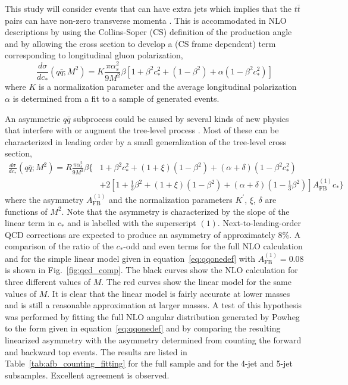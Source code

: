\documentclass{cmspaperpdf}
\begin{document}
This study will consider events that can have extra jets which implies that the $t\bar t$ pairs can have non-zero transverse momenta .  This is accommodated in NLO descriptions by using the Collins-Soper (CS) definition \cite{Collins:1977iv} of the production angle and by allowing the cross section to develop a (CS frame dependent) term corresponding to longitudinal gluon polarization,
\begin{equation}
\frac{d\sigma}{dc_*}(q\bar q;M^2) = K\frac{\pi\alpha_s^2}{9M^2}\beta\left[1+\beta^2c_*^2+\left(1-\beta^2\right)+\alpha\left(1-\beta^2c_*^2\right)\right]
\label{eq:qqnlodef}
\end{equation}
where $K$ is a normalization parameter and the average longitudinal polarization $\alpha$ is determined from a fit to a sample of generated events.

An asymmetric $q\bar q$ subprocess could be caused by several kinds of new physics that interfere with or augment the tree-level process   \cite{Cao:2010zb, Gresham:2011pa}.  Most of these can be characterized in leading order by a small generalization of the tree-level cross section,
\begin{align}
\frac{d\sigma}{dc_*}(q\bar q;M^2) = R\frac{\pi\alpha_s^2}{9M^2}\beta\biggl\lbrace&1+\beta^2c_*^2+\left(1+\xi\right)\left(1-\beta^2\right)+\left(\alpha+\delta\right)\left(1-\beta^2c_*^2\right) \nonumber \\
&+2\left[1+\frac{1}{3}\beta^2+(1+\xi)(1-\beta^2)+\left(\alpha+\delta\right)\left(1-\frac{1}{3}\beta^2\right)\right]A_\mathrm{FB}^{(1)}c_*\biggr\rbrace
\label{eq:qqonedef}
\end{align}
where the asymmetry $A_\mathrm{FB}^{(1)}$ and the normalization parameters $K^\prime$, $\xi$, $\delta$ are functions of $M^2$.  Note that the asymmetry is characterized by the slope of the linear term in $c_*$ and is labelled with the superscript $(1)$.  Next-to-leading-order QCD corrections are expected  \cite{Kuhn:1998kw} to produce an asymmetry of approximately 8\%.  A comparison of the ratio of the $c_*$-odd and even terms for the full NLO calculation and for the simple linear model given in equation~\ref{eq:qqonedef} with $A_\mathrm{FB}^{(1)} = 0.08$ is shown in Fig.~\ref{fig:qcd_comp}.  The black curves show the NLO calculation for three different values of $M$.  The red curves show the linear model for the same values of $M$.  It is clear that the linear model is fairly accurate at lower masses and is still a reasonable approximation at larger masses.  A test of this hypothesis was performed by fitting the full NLO angular distribution generated by Powheg to the form given in equation~\ref{eq:qqonedef} and by comparing the resulting linearized asymmetry with the asymmetry determined from counting the forward and backward top events.  The results are listed in Table~\ref{tab:afb_counting_fitting} for the full sample and for the 4-jet and 5-jet subsamples.  Excellent agreement is observed.
\end{document}
